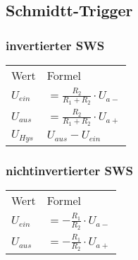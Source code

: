     \subsection{Schmidtt-Trigger}
    \begin{minipage}[t][0.4\pdfpageheight][t]{0.5\columnwidth} %
        \subsubsection{invertierter SWS}
        \renewcommand{\arraystretch}{1.1}
        \begin{table}[H]
            \begin{tabularx}{\columnwidth}{l l}
               Wert & Formel \\
               $U_{ein}$ & $=\frac{R_2}{R_1+R_2}\cdot U_{a-}$ \\
               $U_{aus}$ & $=\frac{R_2}{R_1+R_2}\cdot U_{a+}$ \\
               $U_{Hys}$ & $U_{aus}-U_{ein}$
            \end{tabularx}
        \end{table}
    \end{minipage}
    \begin{minipage}[t][0.4\pdfpageheight][t]{0.5\columnwidth}
        \subsubsection{nichtinvertierter SWS}
        \renewcommand{\arraystretch}{1.1}
        \begin{table}[H]
            \begin{tabularx}{\columnwidth}{l l}
               Wert & Formel \\
               $U_{ein}$ & $=-\frac{R_1}{R_2}\cdot U_{a-}$ \\
               $U_{aus}$ & $=-\frac{R_1}{R_2}\cdot U_{a+}$ \\
            \end{tabularx}
        \end{table}
    \end{minipage}
